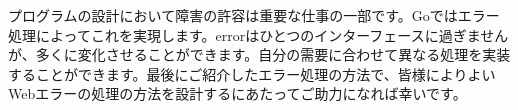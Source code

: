 プログラムの設計において障害の許容は重要な仕事の一部です。Goではエラー処理によってこれを実現します。errorはひとつのインターフェースに過ぎませんが、多くに変化させることができます。自分の需要に合わせて異なる処理を実装することができます。最後にご紹介したエラー処理の方法で、皆様によりよいWebエラーの処理の方法を設計するにあたってご助力になれば幸いです。
